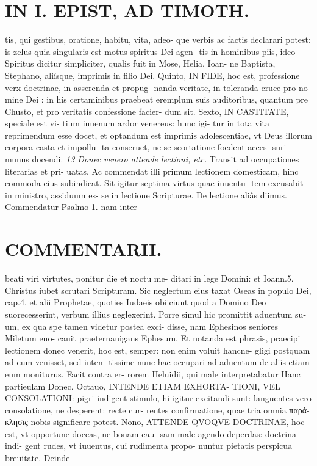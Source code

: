 \documentclass{article}
\begin{document}
\begin{pages}
\section*{IN I. EPIST, AD TIMOTH. }
\marginpar{[ p.109 ]}\pstart tis, qui gestibus, oratione, habitu, vita, adeo- que verbis ac factis declarari potest: is zelus quia singularis est motus spiritus Dei agen- tis in hominibus piis, ideo Spiritus dicitur simpliciter, qualis fuit in Mose, Helia, Ioan- ne Baptista, Stephano, aliísque, imprimis in filio Dei.  \pend\pstart Quinto, IN FIDE, hoc est, professione verx doctrinae, in asserenda et propug- nanda veritate, in toleranda cruce pro no- mine Dei : in his certaminibus praebeat eremplum suis auditoribus, quantum pre Chusto, et pro veritatis confessione facier- dum sit.  \pend\pstart Sexto, IN CASTITATE, speciale est vi- tium iuuenum ardor venereus: hunc igi- tur in tota vita reprimendum esse docet, et optandum est imprimis adolescentiae, vt Deus illorum corpora casta et impollu- ta conseruet, ne se scortatione foedent acces- suri munus docendi.  \pend
\textit{13 Donec venero attende lectioni, etc. }\pstart Transit ad occupationes literarias et pri- uatas. Ac commendat illi primum lectionem domesticam, hinc commoda eius subindicat. Sit igitur septima virtus quae iuuentu- tem excusabit in ministro, assiduum es- se in lectione Scripturae. De lectione aliâs diimus. Commendatur Psalmo 1. nam inter  \pend
\marginpar{[ p.110 ]}
\section*{COMMENTARII. }\pstart beati viri virtutes, ponitur die et noctu me- ditari in lege Domini: et Ioann.5. Christus iubet scrutari Scripturam. Sic neglectum eius taxat Oseas in populo Dei, cap.4. et alii Prophetae, quoties Iudaeis obiiciunt quod a Domino Deo suorecesserint, verbum illius neglexerint.  \pend\pstart Porre simul hic promittit aduentum su- um, ex qua spe tamen videtur postea exci- disse, nam Ephesinos seniores Miletum euo- cauit praeternauigans Ephesum. Et notanda est phrasis, praecipi lectionem donec venerit, hoc est, semper: non enim voluit hancne- gligi postquam ad eum venisset, sed inten- tissime nunc hac occupari ad aduentum de aliis etiam eum moniturus. Facit contra er- rorem Heluidii, qui male interpretabatur Hanc partieulam Donec.  \pend\pstart Octauo, INTENDE ETIAM EXHORTA- TIONI, VEL CONSOLATIONI: pigri indigent stimulo, hi igitur excitandi sunt: languentes vero consolatione, ne desperent: recte cur- rentes confirmatione, quae tria omnia παρά- κλησις nobis significare potest.  \pend\pstart Nono, ATTENDE QVOQVE DOCTRINAE, hoc est, vt opportune doceas, ne bonam cau- sam male agendo deperdas: doctrina indi- gent rudes, vt iuuentus, cui rudimenta propo- nuntur pietatis perspicua breuitate. Deinde  \pend

\end{pages}
\end{document}
